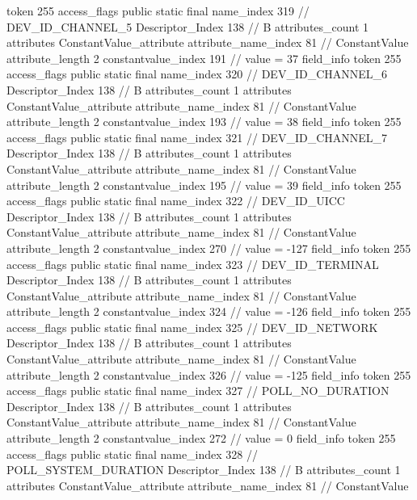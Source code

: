 {{{{{				token	255
				access_flags	public static final
				name_index	319		// DEV_ID_CHANNEL_5
				Descriptor_Index	138		// B
				attributes_count	1
				attributes {
				ConstantValue_attribute {
					attribute_name_index	81		// ConstantValue
					attribute_length	2
					constantvalue_index	191		// value = 37
				}
				}
			}
			field_info {
				token	255
				access_flags	public static final
				name_index	320		// DEV_ID_CHANNEL_6
				Descriptor_Index	138		// B
				attributes_count	1
				attributes {
				ConstantValue_attribute {
					attribute_name_index	81		// ConstantValue
					attribute_length	2
					constantvalue_index	193		// value = 38
				}
				}
			}
			field_info {
				token	255
				access_flags	public static final
				name_index	321		// DEV_ID_CHANNEL_7
				Descriptor_Index	138		// B
				attributes_count	1
				attributes {
				ConstantValue_attribute {
					attribute_name_index	81		// ConstantValue
					attribute_length	2
					constantvalue_index	195		// value = 39
				}
				}
			}
			field_info {
				token	255
				access_flags	public static final
				name_index	322		// DEV_ID_UICC
				Descriptor_Index	138		// B
				attributes_count	1
				attributes {
				ConstantValue_attribute {
					attribute_name_index	81		// ConstantValue
					attribute_length	2
					constantvalue_index	270		// value = -127
				}
				}
			}
			field_info {
				token	255
				access_flags	public static final
				name_index	323		// DEV_ID_TERMINAL
				Descriptor_Index	138		// B
				attributes_count	1
				attributes {
				ConstantValue_attribute {
					attribute_name_index	81		// ConstantValue
					attribute_length	2
					constantvalue_index	324		// value = -126
				}
				}
			}
			field_info {
				token	255
				access_flags	public static final
				name_index	325		// DEV_ID_NETWORK
				Descriptor_Index	138		// B
				attributes_count	1
				attributes {
				ConstantValue_attribute {
					attribute_name_index	81		// ConstantValue
					attribute_length	2
					constantvalue_index	326		// value = -125
				}
				}
			}
			field_info {
				token	255
				access_flags	public static final
				name_index	327		// POLL_NO_DURATION
				Descriptor_Index	138		// B
				attributes_count	1
				attributes {
				ConstantValue_attribute {
					attribute_name_index	81		// ConstantValue
					attribute_length	2
					constantvalue_index	272		// value = 0
				}
				}
			}
			field_info {
				token	255
				access_flags	public static final
				name_index	328		// POLL_SYSTEM_DURATION
				Descriptor_Index	138		// B
				attributes_count	1
				attributes {
				ConstantValue_attribute {
					attribute_name_index	81		// ConstantValue
}}}}}}}

